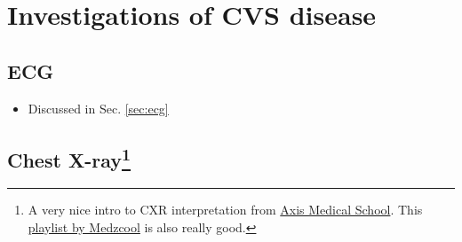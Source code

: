 \documentclass[
  12pt,
]{memoir}
\providecommand{\tightlist}{%
  \setlength{\itemsep}{0pt}\setlength{\parskip}{0pt}}
\begin{document}
\hypertarget{investigations-of-cvs-disease}{%
\section{Investigations of CVS
disease}\label{investigations-of-cvs-disease}}

\hypertarget{ecg}{%
\subsection{ECG}\label{ecg}}

\begin{itemize}
\tightlist
\item
  Discussed in Sec. \ref{sec:ecg}
\end{itemize}

\subsection[CXR]{Chest X-ray\footnote{A very nice intro to CXR
 interpretation from \href{https://youtu.be/KO1eBNaIxBI}{Axis Medical
 School}. This \href{https://youtube.com/playlist?list=PL3n8cHP87ijCCF4J27hHEKKrvub0yVBPa}
 {playlist by Medzcool} is also really good.}}
\end{document}
